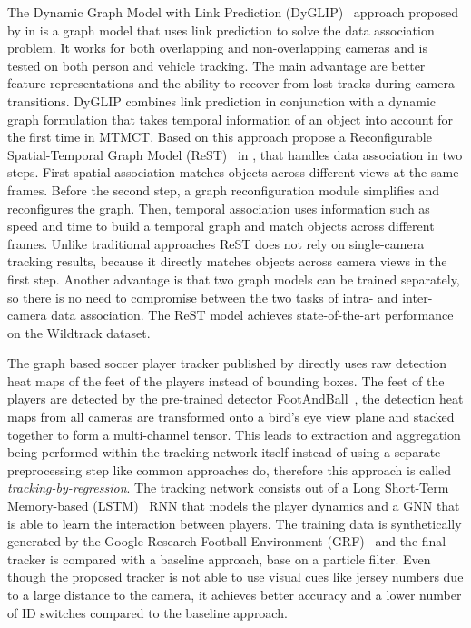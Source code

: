 The Dynamic Graph Model with Link Prediction (DyGLIP)~\cite{Quach21} approach proposed by \citeauthor{Quach21} in \citeyear{Quach21} is a graph model that uses link prediction to solve the data association problem. It works for both overlapping and non-overlapping cameras and is tested on both person and vehicle tracking. The main advantage are better feature representations and the ability to recover from lost tracks during camera transitions. DyGLIP combines link prediction in conjunction with a dynamic graph formulation that takes temporal information of an object into account for the first time in MTMCT. Based on this approach \citeauthor{Cheng23} propose a Reconfigurable Spatial-Temporal Graph Model (ReST)~\cite{Cheng23} in \citeyear{Cheng23}, that handles data association in two steps. First spatial association matches objects across different views at the same frames. Before the second step, a graph reconfiguration module simplifies and reconfigures the graph. Then, temporal association uses information such as speed and time to build a temporal graph and match objects across different frames. Unlike traditional approaches ReST does not rely on single-camera tracking results, because it directly matches objects across camera views in the first step. Another advantage is that two graph models can be trained separately, so there is no need to compromise between the two tasks of intra- and inter-camera data association. The ReST model achieves state-of-the-art performance on the Wildtrack dataset.

The graph based soccer player tracker published by \textcite{Komorowski22} directly uses raw detection heat maps of the feet of the players instead of bounding boxes. The feet of the players are detected by the pre-trained detector FootAndBall~\cite{Komorowski19}, the detection heat maps from all cameras are transformed onto a bird's eye view plane and stacked together to form a multi-channel tensor. This leads to extraction and aggregation being performed within the tracking network itself instead of using a separate preprocessing step like common approaches do, therefore this approach is called \textit{tracking-by-regression}. The tracking network consists out of a Long Short-Term Memory-based (LSTM)~\cite{Gers02} RNN that models the player dynamics and a GNN that is able to learn the interaction between players. The training data is synthetically generated by the Google Research Football Environment (GRF)~\cite{Kurach19} and the final tracker is compared with a baseline approach, base on a particle filter. Even though the proposed tracker is not able to use visual cues like jersey numbers due to a large distance to the camera, it achieves better accuracy and a lower number of ID switches compared to the baseline approach.

